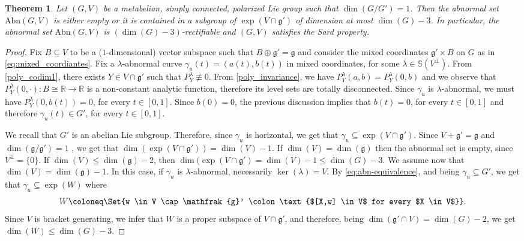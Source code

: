 \documentclass[a4paper,11pt,reqno]{amsart}
\theoremstyle{plain}
\newtheorem{theorem}{Theorem}[section]
\theoremstyle{definition}
\newcommand{\R}{\mathbb R}
\newcommand{\g}{\mathfrak{g}}
\newcommand{\abn}{\mathrm{Abn}}
\begin{document}
\begin{theorem} \label{thm:rank_one}
    Let $(G,V)$ be a metabelian, simply connected, polarized Lie group such that $\dim(G/G')=1$. Then the abnormal set $\abn(G,V)$ is either empty or it is contained in a subgroup of $\exp(V \cap \g')$ of dimension at most $\dim(G)-3$. In particular, the abnormal set $\abn(G,V)$ is $(\dim(G)-3)$-rectifiable and $(G,V)$ satisfies the Sard property.
\end{theorem}

\begin{proof}
    Fix $B \subseteq V$ to be a ($1$-dimensional) vector subspace such that $B \oplus \g' =\g$ and consider the mixed coordinates $\g' \times B$ on $G$ as in \eqref{eq:mixed_coordiantes}.  Fix a $\lambda$-abnormal curve $\gamma_u(t) =(a(t),b(t))$ in mixed coordinates, for some $\lambda \in \mathbb{S}(V^\perp)$. From \cref{poly_codim1}, there exists $Y \in V \cap \g'$  such that $P^\lambda_{Y} \not\equiv 0$. From \cref{poly_invariance}, we have $P^\lambda_Y(a,b) = P^\lambda_Y(0,b)$ and we observe that $P^\lambda_Y(0,\cdot) \colon B \cong \R \to \R$ is a non-constant analytic function, therefore its level sets are totally disconnected. Since $\gamma_u$ is $\lambda$-abnormal, we must have $P^\lambda_{Y}(0,b(t))=0$, for every $t \in [0,1]$. Since $b(0)=0$, the previous discussion implies that $b(t)=0$, for every $t \in [0,1]$ and therefore $\gamma_u(t) \in G'$, for every $t \in [0,1]$.

    We recall that $G'$ is an abelian Lie subgroup. Therefore, since $\gamma_u$ is horizontal, we get that $\gamma_u \subseteq \exp(V \cap \g')$. Since $V + \g'= \g$ and $\dim(\g/\g')=1$ , we get that $\dim(\exp(V \cap \g'))=\dim(V)-1$. If $\dim(V)=\dim(\g)$ then the abnormal set is empty, since $V^\perp = \{0\}$. If $\dim(V) \le \dim(\g) - 2$, then $\dim(\exp(V \cap \g') = \dim(V)-1 \le \dim(G) - 3$. We assume now  that $\dim(V) = \dim(\g) - 1$. In this case, if $\gamma_u$ is $\lambda$-abnormal, necessarily $\ker(\lambda)=V$. 
  By \eqref{eq:abn-equivalence}, and being $\gamma_u \subseteq G'$, we get  that $\gamma_u \subseteq \exp(W)$ where
\begin{equation*}
    W \coloneq  \Set{w \in V \cap \g' \colon \text{$[X,w] \in V$ for every $X \in V$}}.
\end{equation*}
Since $V$ is bracket generating, we infer that $W$ is a proper subspace of $V \cap \g'$, and therefore, being $\dim(\g'\cap V)= \dim(G)-2$, we get $\dim(W) \le \dim(G)-3$.
\end{proof}
\end{document}
